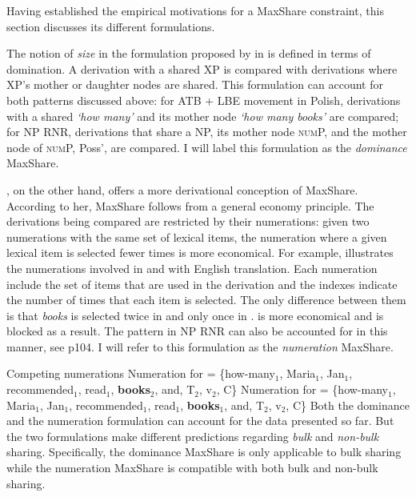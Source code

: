 \documentclass[output=paper]{langscibook}
\begin{document}
Having established the empirical motivations for a MaxShare constraint, this section discusses its different formulations. 

The notion of \textit{size} in the formulation proposed by \cite{Shen:2018a} in  is defined in terms of domination. A derivation with a shared XP is compared with derivations where XP's mother or daughter nodes are shared. This formulation can account for both patterns discussed above: for ATB + LBE movement in Polish, derivations with a shared \textit{`how many'} and its mother node \textit{`how many books'} are compared; for NP RNR, derivations that share a NP, its mother node \textsc{num}P, and the mother node of \textsc{num}P, Poss', are compared. I will label this formulation as the \textit{dominance} MaxShare.

\cite{Citko:2006}, on the other hand, offers a more derivational conception of MaxShare. According to her, MaxShare follows from a general economy principle. The derivations being compared are restricted by their numerations: given two numerations with the same set of lexical items, the numeration where a given lexical item is selected fewer times is more economical. For example,  illustrates the numerations involved in  and  with English translation. Each numeration include the set of items that are used in the derivation and the indexes indicate the number of times that each item is selected. The only difference between them is that \textit{books} is selected twice in  and only once in .  is more economical and  is blocked as a result. 
The pattern in NP RNR can also be accounted for in this manner, see \cite{Shen:2018a} p104. I will refer to this formulation as the \textit{numeration} MaxShare.

\ea 
	\label{shenshenex12}
	Competing numerations
	\ea 
		\label{shenshenex12:a}
		Numeration for  = \{how-many$_1$, Maria$_1$, Jan$_1$, recommended$_1$, read$_1$, \textbf{books$_2$}, and, T$_2$, v$_2$, C\}
	\ex 
		\label{shenshenex12:b}
		Numeration for  = \{how-many$_1$, Maria$_1$, Jan$_1$, recommended$_1$, read$_1$, \textbf{books$_1$}, and, T$_2$, v$_2$, C\} 
	\z 
\z 
Both the dominance and the numeration formulation can account for the data presented so far. 
But the two formulations make different predictions regarding \textit{bulk} and \textit{non-bulk} sharing. 
Specifically, the dominance MaxShare is only applicable to bulk sharing while the numeration MaxShare is compatible with both bulk and non-bulk sharing. 
\end{document}
